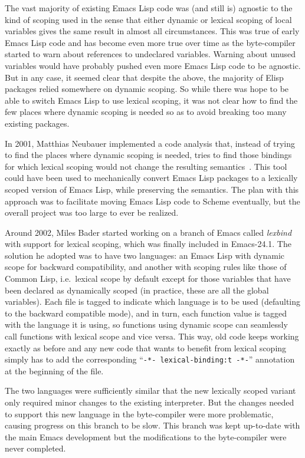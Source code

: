 \documentclass[format=acmsmall, review]{acmart}
\newcommand \Elisp {Emacs Lisp}
\begin{document}
The vast majority of existing \Elisp{} code was (and still is) agnostic to
the kind of scoping used in the sense that either dynamic or lexical scoping
of local variables gives the same result in almost all circumstances.  This was true of early
\Elisp{} code and has become even more true over time as the byte-compiler
started to warn about references to undeclared variables.  Warning about
unused variables would have probably pushed even more \Elisp{} code to be
agnostic.  But in any case, it seemed clear that despite the above, the
majority of Elisp packages relied somewhere on dynamic scoping.  So while
there was hope to be able to switch \Elisp{} to use lexical scoping, it was
not clear how to find the few places where dynamic scoping is needed so as
to avoid breaking too many existing packages.

In 2001, Matthias Neubauer implemented a code
analysis that, instead of trying to find the places where dynamic scoping is
needed, tries to find those bindings for which lexical scoping would not
change the resulting semantics~\cite{Neubauer01}.
This tool could have been used to
mechanically convert \Elisp{} packages to a lexically scoped version of
\Elisp{}, while preserving the semantics.  The plan with this approach
was to facilitate moving \Elisp{} code to Scheme eventually, but the
overall project was too large to ever be realized.

Around 2002, Miles Bader started working on a branch of Emacs called
\emph{lexbind} with support for lexical scoping, which was finally included
in Emacs-24.1.  The solution he adopted was to have two languages: an
\Elisp{} with dynamic scope for backward compatibility, and another with
scoping rules like those of Common Lisp, i.e.~lexical scope by default
except for those variables that have been declared as dynamically scoped (in
practice, these are all the global variables).  Each file is tagged to
indicate which language is to be used (defaulting to the backward compatible
mode), and in turn, each function value is tagged with the language it is
using, so functions using dynamic scope can seamlessly call functions with
lexical scope and vice versa.  This way, old code keeps working exactly
as before and any new code that wants to benefit from lexical scoping
simply has to add the corresponding ``\texttt{-*- lexical-binding:t -*-}''
annotation at the beginning of the file.

The two languages were sufficiently similar that the new lexically scoped
variant only required minor changes to the existing interpreter.  But the
changes needed to support this new language in the byte-compiler were more
problematic, causing progress on this branch to be slow.  This branch was
kept up-to-date with the main Emacs development but the modifications to the
byte-compiler were never completed.
\end{document}
